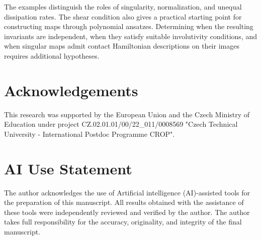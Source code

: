 \documentclass[11pt,a4paper]{article}
\numberwithin{equation}{section}
\theoremstyle{definition}
\theoremstyle{remark}
\begin{document}
The examples distinguish the roles of singularity, normalization,
and unequal dissipation rates. The shear condition also gives a
practical starting point for constructing maps through polynomial
ansatzes. Determining when the resulting invariants are independent,
when they satisfy suitable involutivity conditions, and when
singular maps admit contact Hamiltonian descriptions on their images
requires additional hypotheses.



\section*{Acknowledgements}

This research was supported by the European Union and the Czech Ministry of Education under project CZ.02.01.01/00/22\_011/0008569 "Czech Technical University - International Postdoc Programme CROP".


\section*{AI Use Statement}
The author acknowledges the use of Artificial intelligence (AI)-assisted tools for the preparation of this manuscript. All results obtained with the assistance of these tools were independently reviewed and verified by the author. The author takes full responsibility for the accuracy, originality, and integrity of the final manuscript.



\end{document}
